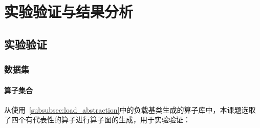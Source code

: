 \chapter{实验验证与结果分析}\label{chap:Result_And_Analysis} 
\section{实验验证}\label{sec:validation}
    \subsection{数据集}\label{subsec:dataset}
        \subsubsection{算子集合}\label{subsec:operator_set}
        从使用~\ref{subsubsec:load_abstraction}中的负载基类生成的算子库中，本课题选取了四个有代表性的算子进行算子图的生成，用于实验验证：
